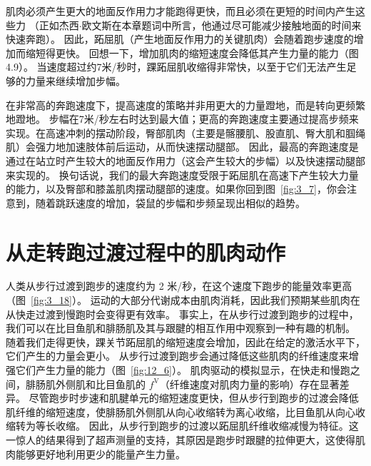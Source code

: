 肌肉必须产生更大的地面反作用力才能跑得更快，而且必须在更短的时间内产生这些力
（正如杰西$\cdot$欧文斯在本章题词中所言，他通过尽可能减少接触地面的时间来快速奔跑）。
因此，跖屈肌（产生地面反作用力的关键肌肉）会随着跑步速度的增加而缩短得更快。
回想一下，增加肌肉的缩短速度会降低其产生力量的能力（图4.9）。
当速度超过约7米/秒时，踝跖屈肌收缩得非常快，以至于它们无法产生足够的力量来继续增加步幅。


在非常高的奔跑速度下，提高速度的策略并非用更大的力量蹬地，而是转向更频繁地蹬地。
步幅在7米/秒左右时达到最大值；更高的奔跑速度主要通过提高步频来实现。在高速冲刺的摆动阶段，臀部肌肉（主要是髂腰肌、股直肌、臀大肌和腘绳肌）会强力地加速肢体前后运动，从而快速摆动腿部。
因此，最高的奔跑速度是通过在站立时产生较大的地面反作用力（这会产生较大的步幅）以及快速摆动腿部来实现的。
换句话说，我们的最大奔跑速度受限于跖屈肌在高速下产生较大力量的能力，以及臀部和膝盖肌肉摆动腿部的速度。如果你回到图~\ref{fig:3_7}，你会注意到，随着跳跃速度的增加，袋鼠的步幅和步频呈现出相似的趋势。


\section{从走转跑过渡过程中的肌肉动作}

人类从步行过渡到跑步的速度约为 2 米/秒，在这个速度下跑步的能量效率更高（图~\ref{fig:3_18}）。
运动的大部分代谢成本由肌肉消耗，因此我们预期某些肌肉在从快走过渡到慢跑时会变得更有效率。
事实上，在从步行过渡到跑步的过程中，我们可以在比目鱼肌和腓肠肌及其与跟腱的相互作用中观察到一种有趣的机制。
随着我们走得更快，踝关节跖屈肌的缩短速度会增加，因此在给定的激活水平下，它们产生的力量会更小。
从步行过渡到跑步会通过降低这些肌肉的纤维速度来增强它们产生力量的能力（图~\ref{fig:12_6}）。
肌肉驱动的模拟显示，在快走和慢跑之间，腓肠肌外侧肌和比目鱼肌的 $f^\text{V}$（纤维速度对肌肉力量的影响）存在显著差异。
尽管跑步时步速和肌腱单元的缩短速度更快，但从步行到跑步的过渡会降低肌纤维的缩短速度，使腓肠肌外侧肌从向心收缩转为离心收缩，比目鱼肌从向心收缩转为等长收缩。
因此，从步行到跑步的过渡以跖屈肌纤维收缩减慢为特征。这一惊人的结果得到了超声测量\cite{farris2012human}的支持，其原因是跑步时跟腱的拉伸更大，这使得肌肉能够更好地利用更少的能量产生力量。



